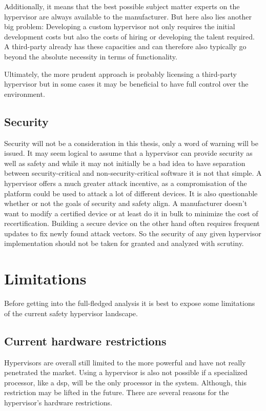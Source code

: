 Additionally, it means that the best possible subject matter experts on the hypervisor are always available to the manufacturer. But here also lies another big problem: Developing a custom hypervisor not only requires the initial development costs but also the costs of hiring or developing the talent required. A third-party already has these capacities and can therefore also typically go beyond the absolute necessity in terms of functionality.

Ultimately, the more prudent approach is probably licensing a third-party hypervisor but in some cases it may be beneficial to have full control over the environment.

\subsection{Security}
Security will not be a consideration in this thesis, only a word of warning will be issued. It may seem logical to assume that a hypervisor can provide security as well as safety and while it may not initially be a bad idea to have separation between security-critical and non-security-critical software it is not that simple. A hypervisor offers a much greater attack incentive, as a compromisation of the platform could be used to attack a lot of different devices. It is also questionable whether or not the goals of security and safety align. A manufacturer doesn't want to modify a certified device or at least do it in bulk to minimize the cost of recertification. Building a secure device on the other hand often requires frequent updates to fix newly found attack vectors. So the security of any given hypervisor implementation should not be taken for granted and analyzed with scrutiny.

\section{Limitations}
Before getting into the full-fledged analysis it is best to expose some limitations of the current safety hypervisor landscape. 
\subsection{Current hardware restrictions}
Hypervisors are overall still limited to the more powerful  and have not really penetrated the  market. Using a hypervisor is also not possible if a specialized processor, like a \acrfull{dsp}, will be the only processor in the system. Although, this restriction may be lifted in the future.  There are several reasons for the hypervisor's hardware restrictions. 

